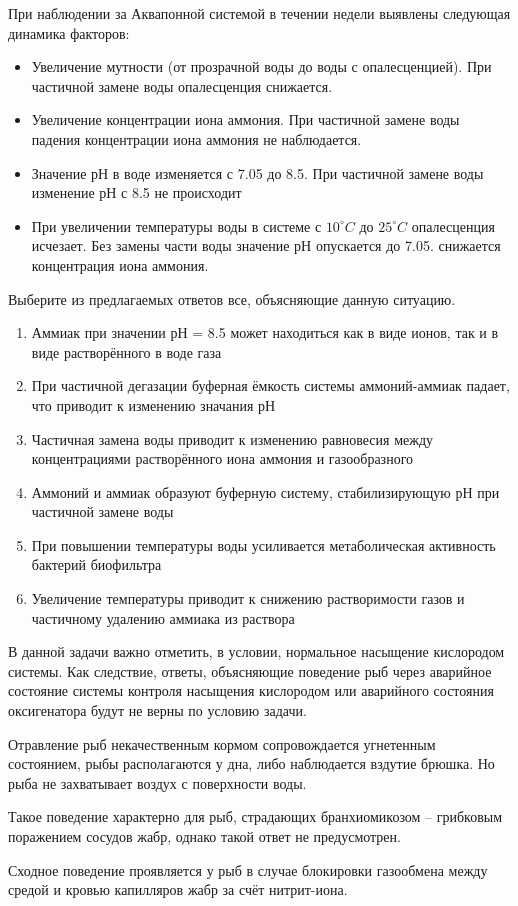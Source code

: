 
При наблюдении за Аквапонной системой в течении недели выявлены следующая динамика факторов:

\begin{itemize}
    \item Увеличение мутности (от прозрачной воды до воды с опалесценцией). При частичной замене воды опалесценция снижается.
    \item Увеличение концентрации  иона аммония. При частичной замене воды падения концентрации иона аммония не наблюдается.
    \item Значение рН в воде изменяется с 7.05 до 8.5. При частичной замене воды изменение рН с 8.5 не происходит
    \item При увеличении температуры воды в системе с $10^{\circ}C$ до $25^{\circ}C$ опалесценция исчезает. Без замены части воды значение  рН опускается до 7.05. снижается концентрация иона аммония.
\end{itemize}

Выберите из предлагаемых ответов все, объясняющие данную ситуацию.

\begin{enumerate}
    \item Аммиак при значении рН = 8.5 может находиться как в виде ионов, так и в виде растворённого в воде газа
    \item При частичной дегазации буферная ёмкость системы аммоний-аммиак падает, что приводит к изменению значания рН
    \item Частичная замена воды приводит к изменению равновесия между концентрациями растворённого иона аммония и газообразного
    \item Аммоний и аммиак образуют буферную систему, стабилизирующую рН при частичной замене воды
    \item При повышении температуры воды усиливается метаболическая активность бактерий биофильтра
    \item Увеличение температуры приводит к снижению растворимости газов и частичному удалению аммиака из раствора
\end{enumerate}

\explanationSection

В данной задачи важно отметить, в условии, нормальное насыщение кислородом системы. Как следствие, ответы, объясняющие поведение рыб через аварийное состояние системы контроля насыщения кислородом или аварийного состояния оксигенатора будут не верны по условию задачи.

Отравление рыб некачественным кормом сопровождается угнетенным состоянием, рыбы располагаются у дна, либо наблюдается вздутие брюшка. Но рыба не захватывает воздух с поверхности воды. 

Такое поведение характерно для рыб, страдающих бранхиомикозом – грибковым поражением сосудов жабр, однако такой ответ не предусмотрен. 

Сходное поведение проявляется у рыб в случае блокировки газообмена между средой и кровью капилляров жабр за счёт нитрит-иона.


